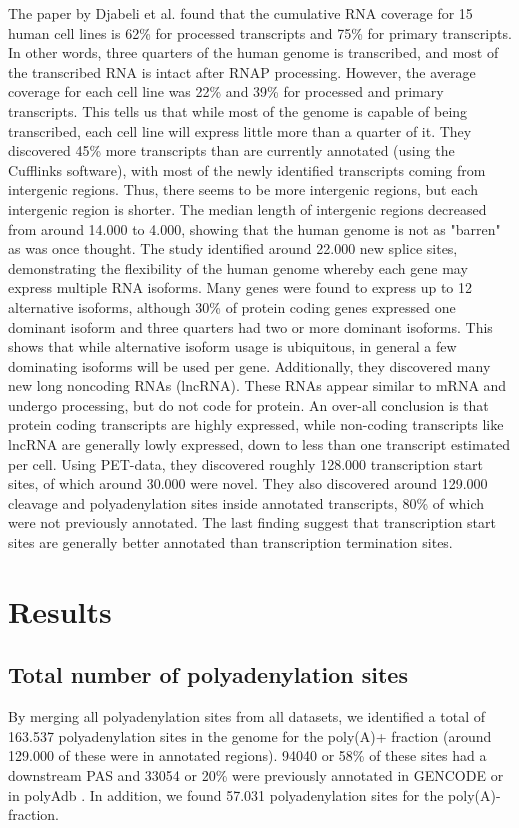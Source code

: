 The paper by Djabeli et al. found that the cumulative RNA coverage for 15 human
cell lines is 62\% for processed transcripts and 75\% for primary transcripts.
In other words, three quarters of the human genome is transcribed, and most of
the transcribed RNA is intact after RNAP processing. However, the average
coverage for each cell line was 22\% and 39\% for processed and primary
transcripts. This tells us that while most of the genome is capable of being
transcribed, each cell line will express little more than a quarter of it. They
discovered 45\% more transcripts than are currently annotated (using the
Cufflinks software), with most of the newly identified transcripts coming from
intergenic regions. Thus, there seems to be more intergenic regions, but each
intergenic region is shorter. The median length of intergenic regions decreased
from around 14.000 to 4.000, showing that the human genome is not as "barren"
as was once thought. The study identified around 22.000 new splice sites,
demonstrating the flexibility of the human genome whereby each gene may express
multiple RNA isoforms. Many genes were found to express up to 12 alternative
isoforms, although 30\% of protein coding genes expressed one dominant isoform
and three quarters had two or more dominant isoforms. This shows that while
alternative isoform usage is ubiquitous, in general a few dominating isoforms
will be used per gene. Additionally, they discovered many new long noncoding
RNAs (lncRNA). These RNAs appear similar to mRNA and undergo processing, but do
not code for protein. An over-all conclusion is that protein coding transcripts
are highly expressed, while non-coding transcripts like lncRNA are generally
lowly expressed, down to less than one transcript estimated per cell. Using
PET-data, they discovered roughly 128.000 transcription start sites, of which
around 30.000 were novel. They also discovered around 129.000 cleavage and
polyadenylation sites inside annotated transcripts, 80\% of which were not
previously annotated. The last finding suggest that transcription start sites
are generally better annotated than transcription termination sites.

\section{Results}
\subsection{Total number of polyadenylation sites}
By merging all polyadenylation sites from all datasets, we identified a total
of 163.537 polyadenylation sites in the genome for the poly(A)+ fraction
(around 129.000 of these were in annotated regions). 94040 or 58\% of these
sites had a downstream PAS and 33054 or 20\% were previously annotated in
GENCODE or in polyAdb \cite{lee_polya_db_2007}. In addition, we found
57.031 polyadenylation sites for the poly(A)- fraction.

